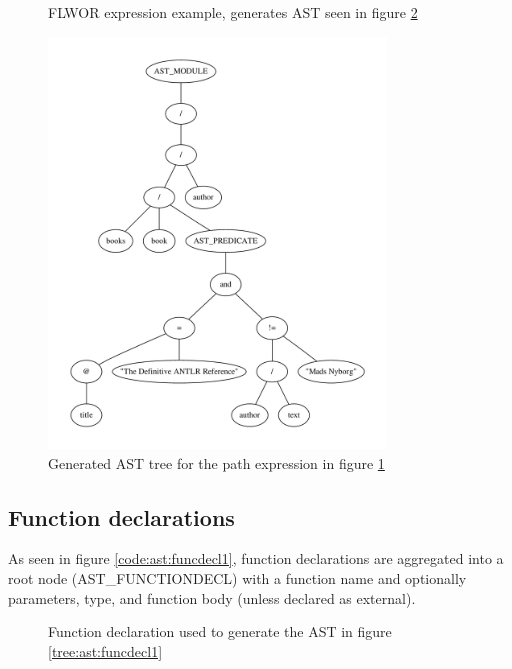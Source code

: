 \begin{figure}[h!]

\caption{FLWOR expression example, generates AST seen in figure \ref{tree:ast:pathexpr}}
\label{code:xq:pathexpr}
\end{figure}

\begin{figure}[h!]
\centering
 \includegraphics[width=0.8\textwidth]{img/graphs/pathexpr}
\caption{Generated AST tree for the path expression in figure 
\ref{code:xq:pathexpr}}
\label{tree:ast:pathexpr}
\end{figure}

\subsection{Function declarations}

As seen in figure \ref{code:ast:funcdecl1}, function declarations are aggregated
into a root node (AST\_FUNCTIONDECL) with a function name and optionally
parameters, type, and function body (unless declared as external).

\begin{figure}[h!]

\caption{Function declaration used to generate the AST in figure
\ref{tree:ast:funcdecl1}}
\label{code:xq:funcdecl1}
\end{figure}

